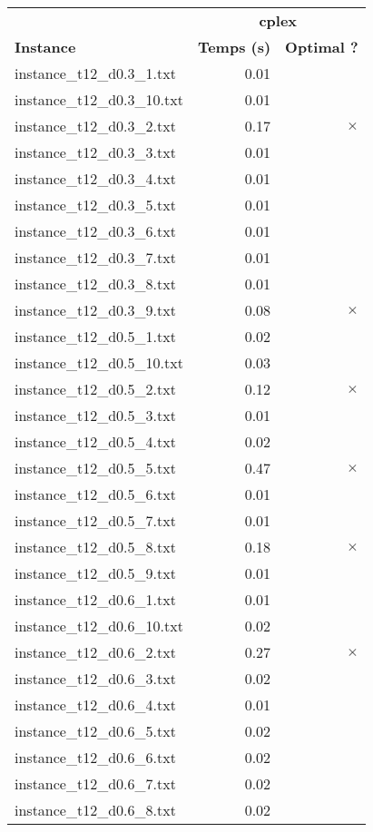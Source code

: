 \documentclass{article}
\begin{document}
\begin{center}
\renewcommand{\arraystretch}{1.4}
 \begin{tabular}{lrr}
	\hline
 & \multicolumn{2}{c}{\textbf{cplex}}\\
\textbf{Instance}  & \textbf{Temps (s)} & \textbf{Optimal ?} \\\hline

instance\_t12\_d0.3\_1.txt & 0.01 & 
\\
instance\_t12\_d0.3\_10.txt & 0.01 & 
\\
instance\_t12\_d0.3\_2.txt & 0.17 & 
$\times$
\\
instance\_t12\_d0.3\_3.txt & 0.01 & 
\\
instance\_t12\_d0.3\_4.txt & 0.01 & 
\\
instance\_t12\_d0.3\_5.txt & 0.01 & 
\\
instance\_t12\_d0.3\_6.txt & 0.01 & 
\\
instance\_t12\_d0.3\_7.txt & 0.01 & 
\\
instance\_t12\_d0.3\_8.txt & 0.01 & 
\\
instance\_t12\_d0.3\_9.txt & 0.08 & 
$\times$
\\
instance\_t12\_d0.5\_1.txt & 0.02 & 
\\
instance\_t12\_d0.5\_10.txt & 0.03 & 
\\
instance\_t12\_d0.5\_2.txt & 0.12 & 
$\times$
\\
instance\_t12\_d0.5\_3.txt & 0.01 & 
\\
instance\_t12\_d0.5\_4.txt & 0.02 & 
\\
instance\_t12\_d0.5\_5.txt & 0.47 & 
$\times$
\\
instance\_t12\_d0.5\_6.txt & 0.01 & 
\\
instance\_t12\_d0.5\_7.txt & 0.01 & 
\\
instance\_t12\_d0.5\_8.txt & 0.18 & 
$\times$
\\
instance\_t12\_d0.5\_9.txt & 0.01 & 
\\
instance\_t12\_d0.6\_1.txt & 0.01 & 
\\
instance\_t12\_d0.6\_10.txt & 0.02 & 
\\
instance\_t12\_d0.6\_2.txt & 0.27 & 
$\times$
\\
instance\_t12\_d0.6\_3.txt & 0.02 & 
\\
instance\_t12\_d0.6\_4.txt & 0.01 & 
\\
instance\_t12\_d0.6\_5.txt & 0.02 & 
\\
instance\_t12\_d0.6\_6.txt & 0.02 & 
\\
instance\_t12\_d0.6\_7.txt & 0.02 & 
\\
instance\_t12\_d0.6\_8.txt & 0.02 & 
\\
\hline\end{tabular}
\end{center}
\end{document}
